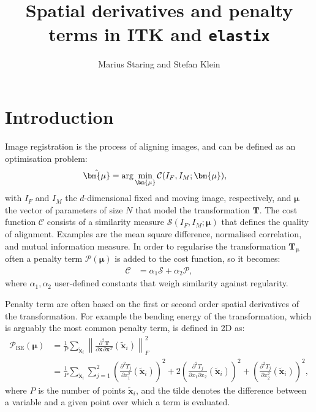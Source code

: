 \documentclass[]{article}
\newcommand{\vT}{\bm{T}}
\newcommand{\vmu}{\bm{\mu}}
\newcommand{\vx}[1][]{\bm{x}_{#1}}
\newcommand{\vxt}[1][]{\bm{\widetilde x}_{#1}}
\newcommand{\elastix}{\texttt{elastix}}
\begin{document}
\title{Spatial derivatives and penalty terms in ITK and \elastix}

\author{Marius Staring and Stefan Klein}
\date{}
\maketitle


\section{Introduction}

Image registration is the process of aligning images, and can be
defined as an optimisation problem:
\begin{align}
\hat \vmu &= \arg \min_{\vmu} \mathcal{C}(I_F, I_M;
\vmu),\label{eq:reg}
\end{align}
with $I_F$ and $I_M$ the $d$-dimensional fixed and moving image,
respectively, and $\vmu$ the vector of parameters of size $N$ that
model the transformation $\vT$. The cost function $\mathcal{C}$
consists of a similarity measure $\mathcal{S}(I_F, I_M; \vmu)$ that
defines the quality of alignment. Examples are the mean square
difference, normalised correlation, and mutual information measure.
In order to regularise the transformation $\vT_{\vmu}$ often a
penalty term $\mathcal{P}(\vmu)$ is added to the cost function, so
it becomes:
\begin{align}
\mathcal{C} &= \alpha_1 \mathcal{S} + \alpha_2 \mathcal{P},
\end{align}
where $\alpha_1, \alpha_2$ user-defined constants that weigh
similarity against regularity.

Penalty term are often based on the first or second order spatial
derivatives of the transformation. For example the bending energy of
the transformation, which is arguably the most common penalty term,
is defined in 2D as:
\begin{align}
\mathcal{P}_{\mathrm{BE}}(\vmu) &= \frac{1}{P} \sum_{\vxt[i]}
\left\| \frac{\partial^2 \vT}{\partial \vx \partial \vx^T}(\vxt[i])
\right\|_F^2 \\
&= \frac{1}{P} \sum_{\vxt[i]} \sum_{j = 1}^2 \left( \frac{\partial^2
T_j}{\partial x_1^2}(\vxt[i]) \right)^2  + 2 \left( \frac{\partial^2
T_j}{\partial x_1 \partial x_2}(\vxt[i]) \right)^2 + \left(
\frac{\partial^2 T_j}{\partial x_2^2}(\vxt[i]) \right)^2,
\end{align}
where $P$ is the number of points $\vxt[i]$, and the tilde denotes
the difference between a variable and a given point over which a
term is evaluated.
\end{document}
